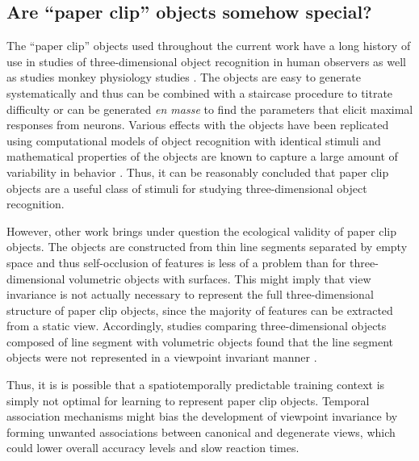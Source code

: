 \documentclass[dwyatte_dissertation.tex]{subfiles}
\begin{document}
\subsection{Are ``paper clip'' objects somehow special?} %
The ``paper clip'' objects used throughout the current work have a long history of use in studies of three-dimensional object recognition in human observers \cite{BulthoffEdelman92,EdelmanBulthoff92,SinhaPoggio96} as well as studies monkey physiology studies \cite{LogothetisPaulsBulthoffEtAl94,LogothetisPaulsPoggio95}. The objects are easy to generate systematically and thus can be combined with a staircase procedure to titrate difficulty or can be generated \textit{en masse} to find the parameters that elicit maximal responses from neurons. Various effects with the objects have been replicated using computational models of object recognition with identical stimuli \cite{RiesenhuberPoggio99} and mathematical properties of the objects are known to capture a large amount of variability in behavior \cite{BalasSinha09b}. Thus, it can be reasonably concluded that paper clip objects are a useful class of stimuli for studying three-dimensional object recognition.

However, other work brings under question the ecological validity of paper clip objects. The objects are constructed from thin line segments separated by empty space and thus self-occlusion of features is less of a problem than for three-dimensional volumetric objects with surfaces. This might imply that view invariance is not actually necessary to represent the full three-dimensional structure of paper clip objects, since the majority of features can be extracted from a static view. Accordingly, studies comparing three-dimensional objects composed of line segment with volumetric objects found that the line segment objects were not represented in a viewpoint invariant manner \cite{FarahRochlinKlen94,PizloStevenson99}.

Thus, it is is possible that a spatiotemporally predictable training context is simply not optimal for learning to represent paper clip objects. Temporal association mechanisms \cite{StringerPerryRollsEtAl06,WallisBaddeley97,IsikLeiboPoggio12} might bias the development of viewpoint invariance by forming unwanted associations between canonical and degenerate views, which could lower overall accuracy levels and slow reaction times. 
\end{document}
